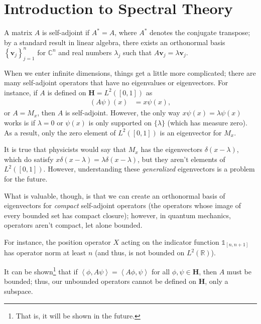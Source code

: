 \documentclass[12pt]{extarticle}
\newcommand{\R}{\mathbb{R}}
\newcommand{\C}{\mathbb{C}}
\newcommand{\set}[1]{\left\{#1\right\}}
\newcommand{\iprod}[2]{\left\langle #1,#2\right\rangle}
\theoremstyle{plain}
\theoremstyle{definition}
\theoremstyle{remark}
\renewcommand{\newline}{\hfill\break}
\begin{document}
  \section{Introduction to Spectral Theory}%
  A matrix $A$ is self-adjoint if $A^{\ast} = A$, where $A^{\ast}$ denotes the conjugate transpose; by a standard result in linear algebra, there exists an orthonormal basis $\set{\mathbf{v}_j}_{j=1}^{n}$ for $\C^n$ and real numbers $\lambda_j$ such that $A\mathbf{v}_j = \lambda \mathbf{v}_j$.\newline

  When we enter infinite dimensions, things get a little more complicated; there are many self-adjoint operators that have no eigenvalues or eigenvectors. For instance, if $A$ is defined on $\mathbf{H} = L^{2}([0,1])$ as
  \begin{align*}
    (A\psi)(x) &= x\psi(x),
  \end{align*}
  or $A = M_x$, then $A$ is self-adjoint. However, the only way $x \psi(x) = \lambda \psi(x)$ works is if $\lambda = 0$ or $\psi(x)$ is only supported on $\{\lambda\}$ (which has measure zero). As a result, only the zero element of $L^{2}([0,1])$ is an eigenvector for $M_x$.\newline

  It is true that physicists would say that $M_x$ has the eigenvectors $\delta(x-\lambda)$, which do satisfy $x\delta(x-\lambda) = \lambda\delta(x-\lambda)$, but they aren't elements of $L^{2}([0,1])$. However, understanding these \textit{generalized} eigenvectors is a problem for the future.\newline

  What is valuable, though, is that we can create an orthonormal basis of eigenvectors for \textit{compact} self-adjoint operators (the operators whose image of every bounded set has compact closure); however, in quantum mechanics, operators aren't compact, let alone bounded.\newline

  For instance, the position operator $X$ acting on the indicator function $\mathbb{1}_{[n,n+1]}$ has operator norm at least $n$ (and thus, is not bounded on $L^{2}(\R)$).\newline

  It can be shown\footnote{That is, it will be shown in the future.} that if $\iprod{\phi}{A\psi} = \iprod{A\phi}{\psi}$ for all $\phi,\psi \in \mathbf{H}$, then $A$ must be bounded; thus, our unbounded operators cannot be defined on $\mathbf{H}$, only a subspace.\newline
\end{document}
